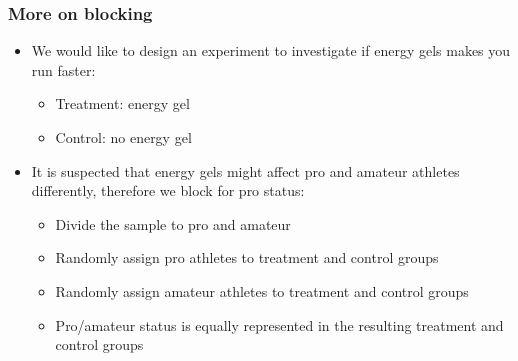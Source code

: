 \documentclass[slidestop,compress,mathserif]{beamer}
\begin{document}
\begin{frame}
\frametitle{More on blocking}


{
\begin{center}
\end{center}
}
{
\begin{itemize}
\item We would like to design an experiment to investigate if energy gels makes you run faster:

\pause

\begin{itemize}
\item Treatment: energy gel
\item Control: no energy gel
\end{itemize}

\pause

\item It is suspected that energy gels might affect pro and amateur athletes differently, therefore we block for pro status:

\pause

\begin{itemize}
\item Divide the sample to pro and amateur
\item Randomly assign pro athletes to treatment and control groups
\item Randomly assign amateur athletes to treatment and control groups
\item Pro/amateur status is equally represented in the resulting treatment and control groups
\end{itemize}
\end{itemize}
}

\pause


\end{frame}

\end{document}
